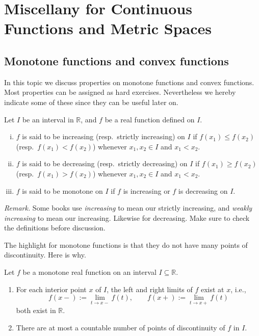 \section{Miscellany for Continuous Functions and Metric Spaces}
\label{sec:misc-cont}

\subsection{Monotone functions and convex functions}

In this topic we discuss properties on monotone functions and convex functions.
Most properties can be assigned as hard exercises.
Nevertheless we hereby indicate some of these since they can be useful later on.

\begin{defn}
  Let $I$ be an interval in $\mathbb{R}$, and $f$ be a real function defined on $I$.
  \begin{enumerate}[(i)]
    \item $f$ is said to be \textsf{increasing} (resp.\ \textsf{strictly increasing}) on $I$ if $f(x_1) \leqslant f(x_2)$ (resp.\ $f(x_1) < f(x_2)$) whenever $x_1, x_2 \in I$ and $x_1 < x_2$.
  
    \item $f$ is said to be \textsf{decreasing} (resp.\ \textsf{strictly decreasing}) on $I$ if $f(x_1) \geqslant f(x_2)$ (resp.\ $f(x_1) > f(x_2)$) whenever $x_1, x_2 \in I$ and $x_1 < x_2$.
      \item $f$ is said to be \textsf{monotone} on $I$ if $f$ is increasing or $f$ is decreasing on $I$.
  \end{enumerate}
\end{defn}

\noindent\textit{Remark.} Some books use {\em increasing} to mean our strictly increasing, and {\em weakly increasing} to mean our increasing.  Likewise for decreasing.
Make sure to check the definitions before discussion.

The highlight for monotone functions is that they do not have many points of discontinuity.  Here is why. 
\begin{prop}
  Let $f$ be a monotone real function on an interval $I \subseteq \mathbb{R}$.
  \begin{enumerate}[$(a)$]
    \item For each interior point $x$ of $I$, the left and right limits of $f$ exist at $x$, i.e.,
      \[
	f(x-) := \lim_{t \to x-} f(t), \qquad
	f(x+) := \lim_{t \to x+} f(t)
      \]
      both exist in $\mathbb{R}$.

    \item There are at most a countable number of points of discontinuity of $f$ in $I$.
  \end{enumerate}
\end{prop}

